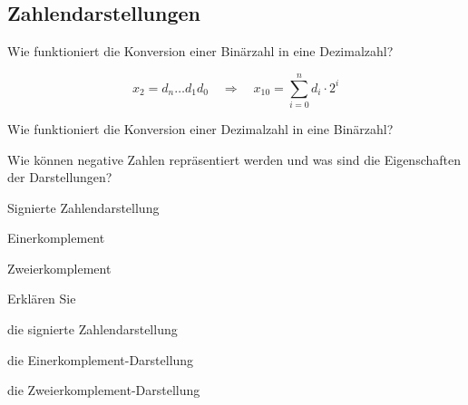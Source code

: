 \documentclass
[
  draft    = true,
  fontsize = 11pt,
  parskip  = half-,
  BCOR     = 0pt,
  DIV      = 11,
  ngerman,
  dvipsnames
]
{scrartcl}
\begin{document}
\subsection*{Zahlendarstellungen}
\begin{mytemize}
  \item Wie funktioniert die Konversion einer Binärzahl in eine Dezimalzahl?
        \begin{achim}
          \begin{equation*}
            x_2=d_n\ldots d_1d_0
            \quad\Rightarrow\quad
            x_{10}=\sum_{i=0}^{n}d_i\cdot2^i
          \end{equation*}
        \end{achim}
  \item Wie funktioniert die Konversion einer Dezimalzahl in eine Binärzahl?
  \item Wie können negative Zahlen repräsentiert werden und was sind die Eigenschaften der Darstellungen?
        \begin{achim}
          \begin{mytemize}
            \item Signierte Zahlendarstellung
            \item Einerkomplement
            \item Zweierkomplement
          \end{mytemize}
        \end{achim}
  \item Erklären Sie
        \begin{mytemize}
          \item die signierte Zahlendarstellung
          \item die Einerkomplement-Darstellung
          \item die Zweierkomplement-Darstellung
        \end{mytemize}
\end{mytemize}

\end{document}
